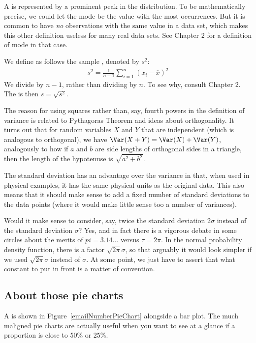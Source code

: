 A  is represented by a prominent peak in the distribution. To be mathematically precise, we could let the mode be the value with the most occurrences. But it is common to have \emph{no} observations with the same value in a data set, which makes this other definition useless for many real data sets. See Chapter 2 for a definition of mode in that case.

\label{variability}

We define as follows the sample \label{varianceIsDefined}, denoted by $s_{}^2$:
\begin{align*}
s_{}^2 = \frac1{n-1}\sum_{i=1}^n (x_i-\overline x)^2
\end{align*}
We divide by $n-1$, rather than dividing by $n$. To see why, consult Chapter 2. The  is then $s=\sqrt{s^2}$.

The reason for using squares rather than, say, fourth powers in the definition of variance is related to Pythagoras Theorem and ideas about orthogonality.
It turns out that for random variables $X$ and $Y$ that are independent (which is analogous to orthogonal), we have $\Var(X+Y)=\Var(X)+\Var(Y)$, analogously to how if $a$ and $b$ are side lengths of orthogonal sides in a triangle, then the length of the hypotenuse is $\sqrt{a^2+b^2}$.

The standard deviation has an advantage over the variance in that, when used in physical examples, it has the same physical units as the original data. This also means that it should make sense to add a fixed number of standard deviations to the data points (where it would make little sense too a number of variances).

Would it make sense to consider, say, twice the standard deviation $2\sigma$ instead of the standard deviation $\sigma$? Yes, and in fact there is a vigorous debate in some circles about the merits of $pi=3.14\dots$ versus $\tau=2\pi$. In the normal probability density function, there is a factor $\sqrt{2\pi}\sigma$, so that arguably it would look simpler if we used $\sqrt{2\pi}\sigma$ instead of $\sigma$. At some point, we just have to assert that what constant to put in front is a matter of convention.

\subsection{About those pie charts}
A  is shown in Figure~\vref{emailNumberPieChart} alongside a bar plot.
The much maligned pie charts are actually useful when you want to see at a glance if a proportion is close to 50\% or 25\%.

